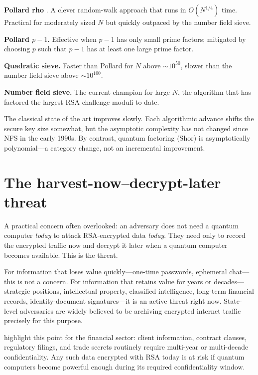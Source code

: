 \textbf{Pollard rho} \citep{pollard_monte_1975}. A clever random-walk approach that runs in $O(N^{1/4})$ time. Practical for moderately sized $N$ but quickly outpaced by the number field sieve.

\textbf{Pollard $p-1$.} Effective when $p-1$ has only small prime factors; mitigated by choosing $p$ such that $p-1$ has at least one large prime factor.

\textbf{Quadratic sieve.} Faster than Pollard for $N$ above $\sim 10^{50}$, slower than the number field sieve above $\sim 10^{100}$.

\textbf{Number field sieve.} The current champion for large $N$, the algorithm that has factored the largest RSA challenge moduli to date.

The classical state of the art improves slowly. Each algorithmic advance shifts the secure key size somewhat, but the asymptotic complexity has not changed since NFS in the early 1990s. By contrast, quantum factoring (Shor) is asymptotically polynomial---a category change, not an incremental improvement.

\section{The harvest-now--decrypt-later threat}

A practical concern often overlooked: an adversary does not need a quantum computer \emph{today} to attack RSA-encrypted data \emph{today}. They need only to record the encrypted traffic now and decrypt it later when a quantum computer becomes available. This is the  threat.

For information that loses value quickly---one-time passwords, ephemeral chat---this is not a concern. For information that retains value for years or decades---strategic positions, intellectual property, classified intelligence, long-term financial records, identity-document signatures---it is an active threat right now. State-level adversaries are widely believed to be archiving encrypted internet traffic precisely for this purpose.

\citet{auer_quantum_2024} highlight this point for the financial sector: client information, contract clauses, regulatory filings, and trade secrets routinely require multi-year or multi-decade confidentiality. Any such data encrypted with RSA today is at risk if quantum computers become powerful enough during its required confidentiality window.

